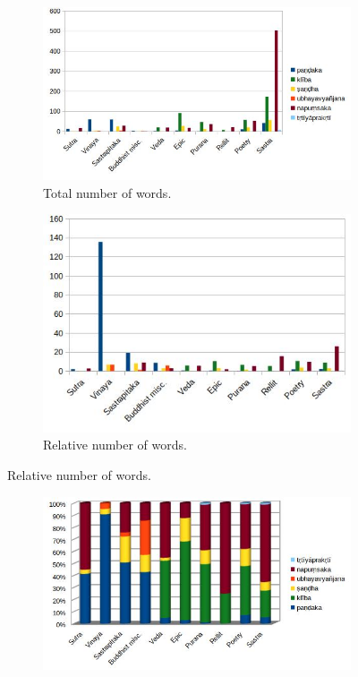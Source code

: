 \begin{figure}[!h]
  \begin{subfigure}{0.558\linewidth}
    \includegraphics[width=\linewidth]{sanskrit.jpg}
    \caption{Total number of words.}
  \end{subfigure}
  \hfill
  \begin{subfigure}{0.442\linewidth}
    \includegraphics[width=\linewidth]{sanskrit_weighted.jpg}
    \caption{Relative number of words.}
  \end{subfigure}
\setcounter{figure}{4}
\label{sanskrit1}
\end{figure}

\begin{figure}[!h]
  \begin{subfigure}{\linewidth}
  \begin{center}
    \includegraphics[width=0.5\linewidth]{sanskrit_perc.jpg}
  \end{center}
  \end{subfigure}
\setcounter{figure}{5}
\label{sanskrit2}
\end{figure}

